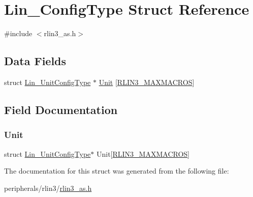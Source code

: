 \hypertarget{struct_lin___config_type}{}\section{Lin\+\_\+\+Config\+Type Struct Reference}
\label{struct_lin___config_type}


{\ttfamily \#include $<$rlin3\+\_\+as.\+h$>$}

\subsection*{Data Fields}
\begin{DoxyCompactItemize}
\item 
struct \mbox{\hyperlink{struct_lin___unit_config_type}{Lin\+\_\+\+Unit\+Config\+Type}} $\ast$ \mbox{\hyperlink{struct_lin___config_type_a5593b09174d9fcae6a432f0346388f48}{Unit}} \mbox{[}\mbox{\hyperlink{rlin3_8h_a9b93defb519b02016549915cdb9f6404}{R\+L\+I\+N3\+\_\+\+M\+A\+X\+M\+A\+C\+R\+OS}}\mbox{]}
\end{DoxyCompactItemize}


\subsection{Field Documentation}
\mbox{\label{struct_lin___config_type_a5593b09174d9fcae6a432f0346388f48}} 
\subsubsection{\texorpdfstring{Unit}{Unit}}
{\footnotesize\ttfamily struct \mbox{\hyperlink{struct_lin___unit_config_type}{Lin\+\_\+\+Unit\+Config\+Type}}$\ast$ Unit\mbox{[}\mbox{\hyperlink{rlin3_8h_a9b93defb519b02016549915cdb9f6404}{R\+L\+I\+N3\+\_\+\+M\+A\+X\+M\+A\+C\+R\+OS}}\mbox{]}}



The documentation for this struct was generated from the following file\+:\begin{DoxyCompactItemize}
\item 
peripherals/rlin3/\mbox{\hyperlink{rlin3__as_8h}{rlin3\+\_\+as.\+h}}\end{DoxyCompactItemize}

